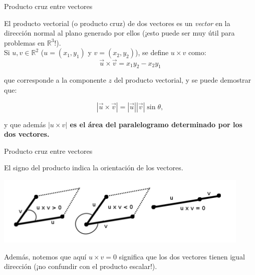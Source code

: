 \documentclass[compress]{beamer}
\newcommand{\be}{\begin{equation*}}
\newcommand{\ee}{\end{equation*}}
\begin{document}
\begin{frame}{Producto cruz entre vectores}

El producto vectorial (o producto cruz) de dos vectores es un \emph{vector} en la direcci\'on normal al plano generado por ellos (¡esto puede ser muy \'util para problemas en $\mathbb{R}^3$!). \\

Si $u,v \in \mathbb{R}^2$ ($u = (x_1,y_1)$ y $v = (x_2,y_2)$), se define $u \times v$ como:
\be
   \vec{u} \times \vec{v} = x_1 y_2 - x_2 y_1
\ee

que corresponde a la componente $z$ del producto vectorial, y se puede demostrar que:

\be
    |\vec{u} \times \vec{v}| = |\vec{u}| |\vec{v}| \sin\theta,
\ee

y que adem\'as \textbf{ $|u \times v|$ es el \'area del paralelogramo determinado por los dos vectores.}

\end{frame}


\begin{frame}{Producto cruz entre vectores}

El signo del producto indica la orientaci\'on de los vectores.
%
\begin{center}
\includegraphics[scale=0.6]{images/producto_cruz.png}
\end{center}
%

Adem\'as, notemos que aqu\'i $u \times v = 0$ significa que los dos vectores tienen igual direcci\'on (¡no confundir con el producto escalar!). \\

\end{frame}
\end{document}
